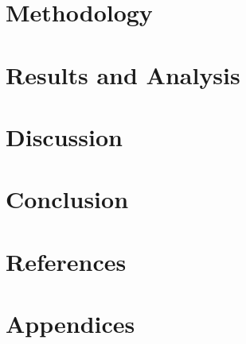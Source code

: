 \documentclass[titlepage]{article}
\numberwithin{figure}{section}
\begin{document}
\section{Methodology}

\pagebreak
\section{Results and Analysis}

\pagebreak
\section{Discussion}

\pagebreak
\section{Conclusion}


\pagebreak

\section{References}

\pagebreak

\section*{Appendices}


\pagebreak
\end{document}

